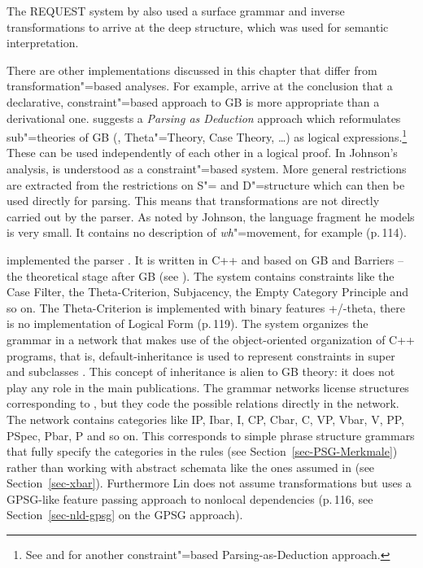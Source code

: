 The REQUEST system by \citet{Plath73a} also used a surface grammar and inverse transformations to
arrive at the deep structure, which was used for semantic interpretation.

There are other implementations discussed in this chapter that differ from transformation"=based analyses. For example, \citet[, Section~4]{KT91a}
arrive at the conclusion that a declarative, constraint"=based approach to GB is more appropriate than a derivational one. \citet{Johnson89a}
suggests a \emph{Parsing as Deduction} approach which reformulates sub"=theories of GB (\xbart,
Theta"=Theory, Case Theory, \ldots) as logical expressions.\footnote{%
	See  and  for another constraint"=based Parsing-as-Deduction approach.
}
These can be used independently of each other in a logical proof. In Johnson's analysis, \gbt is understood as a constraint"=based system. 
More general restrictions are extracted from the restrictions on S"= and D"=structure which can then be used directly for parsing. This means that 
transformations are not directly carried out by the parser. As noted by Johnson, the language fragment he models is very small. It contains no
description of \emph{wh}"=movement, for example (p.\,114). 

\citet{Lin93a} implemented the parser . It is written in C++ and based on GB and Barriers -- the theoretical
stage after GB (see \citealp{Chomsky86b}). The system contains constraints like
the Case Filter, the Theta-Criterion, Subjacency, the Empty Category Principle and so on. The
Theta-Criterion is implemented with binary features +/-theta, there is no implementation of Logical
Form (p.\,119). The system organizes the grammar in a network that makes use of the object-oriented
organization of C++ programs, that is, default-inheritance is used to represent constraints in super
and subclasses \citep[Section~5]{Lin93a}. This concept of inheritance is alien to GB theory: it does not play any role in the
main publications. The grammar networks license structures corresponding to \xbart, but they code
the possible relations directly in the network. The network contains categories like IP, Ibar, I,
CP, Cbar, C, VP, Vbar, V, PP, PSpec, Pbar, P and so on. This corresponds to simple phrase structure
grammars that fully specify the categories in the rules (see Section~\ref{sec-PSG-Merkmale}) rather than working with abstract schemata
like the ones assumed in \xbart (see Section~\ref{sec-xbar}). Furthermore Lin does not assume transformations but uses a
GPSG-like feature passing approach to nonlocal dependencies (p.\,116, see Section~\ref{sec-nld-gpsg} on the GPSG approach).

